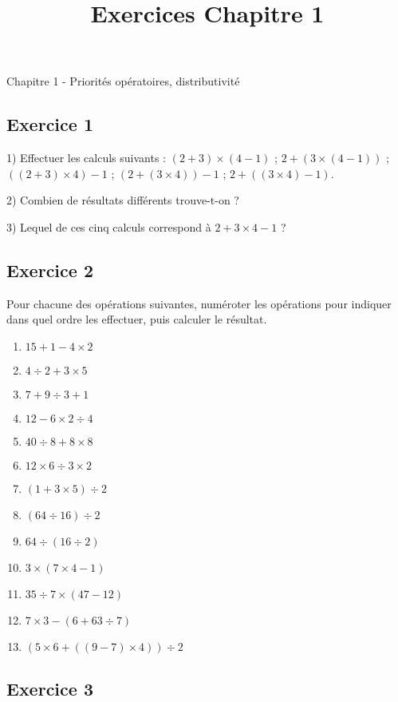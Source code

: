 \documentclass[12 pt]{extarticle}
\title{Exercices Chapitre 1}
\date{}
\theoremstyle{plain}
\begin{document}
\begin{center}{\Large Chapitre 1 - Priorités opératoires, distributivité}\\ 
 \end{center}
 
 
 \subsection*{Exercice 1}

 
1) Effectuer les calculs suivants : $(2 + 3) \times (4 - 1)$ ; 
$ 2 + ( 3 \times (4 - 1) ) $ ; 
$( ( 2 + 3 ) \times 4 ) - 1 $ ; 
$ ( 2 + ( 3 \times 4 ) ) - 1$ ; 
$2 + ((3 \times 4) - 1)$. 

2) Combien de résultats différents trouve-t-on ? 

3) Lequel de ces cinq calculs correspond à $ 2 + 3 \times 4 - 1$ ?

\subsection*{Exercice 2}
 
 
 Pour chacune des opérations suivantes, numéroter les opérations 
 pour indiquer dans quel ordre les effectuer, puis calculer le 
 résultat. 
 \begin{enumerate}
 \item $15 + 1 - 4 \times 2$
 \item$4 \div 2 + 3 \times 5$ 
 \item $7 + 9 \div 3 + 1$
 \item $12 - 6 \times 2 \div 4$
 \item $40 \div 8 + 8 \times 8$
 \item $12 \times 6 \div 3 \times 2$
 \item $(1 + 3 \times 5) \div 2$
 \item $(64\div 16) \div 2$
 \item $64\div (16 \div 2)$
 \item $3 \times ( 7 \times 4 -1)$
 \item $35 \div 7\times (47-12)$
 \item $ 7\times 3  - (6 + 63\div 7)$
  \item $ (5 \times 6+ ((9-7)\times 4))\div 2$
 \end{enumerate}
 
 \subsection*{Exercice 3} 
 
\end{document}

